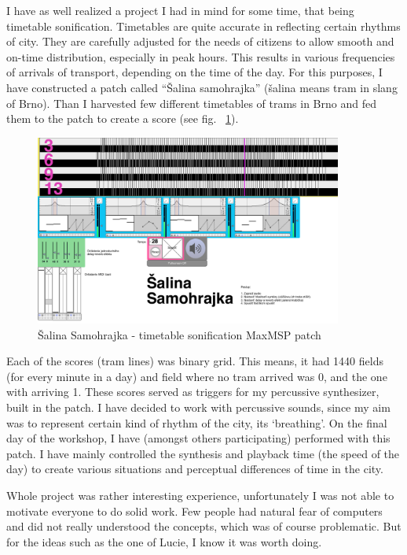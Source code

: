\documentclass[12pt,a4paper,oneside]{report}
\begin{document}
I have as well realized a project I had in mind for some time, that being timetable sonification. Timetables are quite accurate in reflecting certain rhythms of city. They are carefully adjusted for the needs of citizens to allow smooth and on-time distribution, especially in peak hours. This results in various frequencies of arrivals of transport, depending on the time of the day. For this purposes, I have constructed a patch called ``Šalina samohrajka'' (šalina means tram in slang of Brno). Than I harvested few different timetables of trams in Brno and fed them to the patch to create a score (see fig. ~\ref{fig:salina}).

\begin{figure}  
  \centering
    \includegraphics[width=0.9\textwidth]{img/salina}
	\caption{Šalina Samohrajka - timetable sonification MaxMSP patch}
	\label{fig:salina}
\end{figure}

Each of the scores (tram lines) was binary grid. This means, it had 1440 fields (for every minute in a day) and field where no tram arrived was 0, and the one with arriving 1. These scores served as triggers for my percussive synthesizer, built in the patch. I have decided to work with percussive sounds, since my aim was to represent certain kind of rhythm of the city, its `breathing'. On the final day of the workshop, I have (amongst others participating) performed with this patch. I have mainly controlled the synthesis and playback time (the speed of the day) to create various situations and perceptual differences of time in the city. 

Whole project was rather interesting experience, unfortunately I was not able to motivate everyone to do solid work. Few people had natural fear of computers and did not really understood the concepts, which was of course problematic. But for the ideas such as the one of Lucie, I know it was worth doing.
\end{document}
